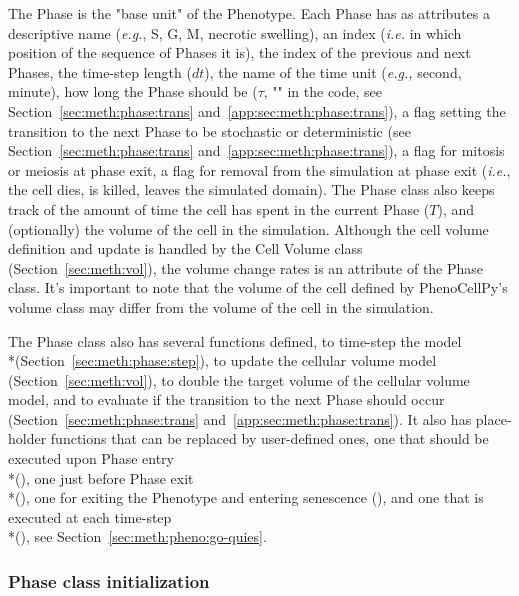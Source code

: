 
The Phase is the "base unit" of the Phenotype. Each Phase has as attributes  a descriptive name (\textit{e.g.}, S, G, M, necrotic swelling), an index (\textit{i.e.} in which position of the sequence of Phases it is), the index of the previous and next Phases, the time-step length ($dt$), the name of the time unit (\textit{e.g.,} second, minute), how long the Phase should be ($\tau$, "" in the code, see Section~\ref{sec:meth:phase:trans} and~\ref{app:sec:meth:phase:trans}), a flag setting the transition to the next Phase to be stochastic or deterministic (see Section~\ref{sec:meth:phase:trans} and~\ref{app:sec:meth:phase:trans}), a flag for mitosis or meiosis at phase exit, a flag for removal from the simulation at phase exit (\textit{i.e.}, the cell dies, is killed, leaves the simulated domain). The Phase class also keeps track of the amount of time the cell has spent in the current Phase ($T$), and (optionally) the volume of the cell in the simulation. Although the cell volume definition and update is handled by the Cell Volume class (Section~\ref{sec:meth:vol}), the volume change rates is an attribute of the Phase class. It's important to note that the volume of the cell defined by PhenoCellPy's volume class may differ from the volume of the cell in the simulation.

The Phase class also has several functions defined, to time-step the model \\*(Section~\ref{sec:meth:phase:step}), to update the cellular volume model (Section~\ref{sec:meth:vol}), to double the target volume of the cellular volume model, and to evaluate if the transition to the next Phase should occur (Section~\ref{sec:meth:phase:trans} and~\ref{app:sec:meth:phase:trans}). It also has place-holder functions that can be replaced by user-defined ones, one that should be executed upon Phase entry \\*(), one just before Phase exit \\*(), one for exiting the Phenotype and entering senescence (), and one that is executed at each time-step \\*(), see Section~\ref{sec:meth:pheno:go-quies}. 

\subsubsection{Phase class initialization}\label{sec:meth:phase:init}

